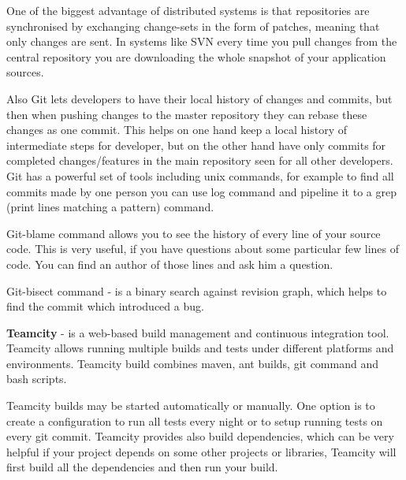   One of the biggest advantage of distributed systems is that repositories are
  synchronised by exchanging change-sets in the form of patches, meaning that 
  only changes are sent. In systems like SVN every time you pull changes from
  the central repository you are downloading the whole snapshot of your application sources.
  
  Also Git lets developers to have their local history of changes and commits,
  but then when pushing changes to the master repository they can rebase these changes as one commit.
  This helps on one hand keep a local history of intermediate steps for
  developer, but on the other hand have only commits for completed changes/features in the main repository
  seen for all other developers. Git has a powerful set of tools including unix commands,
  for example to find all commits made by one person you can use log command and pipeline it to a grep 
  (print lines matching a pattern) command.
  
   Git-blame command allows you to see the history of every line of your source
   code. This is very useful, if you have questions about some particular few lines of code.
   You can find an author of those lines and ask him a question.
   
   Git-bisect command - is a binary search against revision graph, which helps to find the commit which
   introduced a bug.

  \textbf{Teamcity} - is a web-based build management and continuous integration
  tool. Teamcity allows running multiple builds and tests under different platforms and environments.
  Teamcity build combines maven, ant builds, git command and bash scripts.
  
  Teamcity builds may be started automatically or manually. One option is to create a configuration to run all
  tests every night or to setup running tests on every git commit. Teamcity
  provides also build dependencies, which can be very helpful if your project
  depends on some other projects or libraries, Teamcity will first build all the dependencies and then run your build.
  
